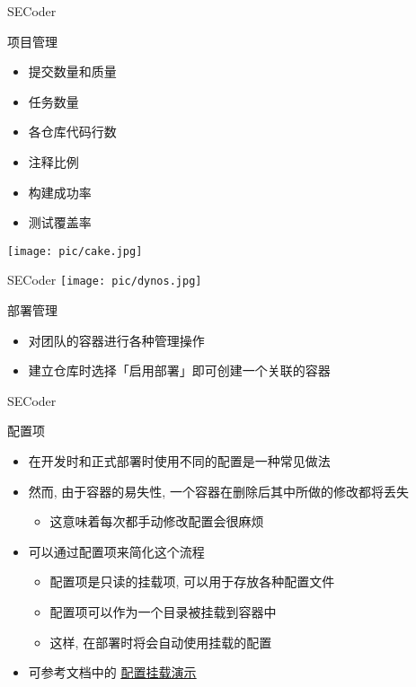 \documentclass{beamer}
\begin{document}
\begin{frame}{SECoder}
    \begin{minipage}{0.35\linewidth}
        \begin{block}{项目管理}
            \begin{itemize}
                \item 提交数量和质量
                \item 任务数量
                \item 各仓库代码行数
                \item 注释比例
                \item 构建成功率
                \item 测试覆盖率
            \end{itemize}
        \end{block}
    \end{minipage}
    \begin{minipage}{0.6\linewidth}
        \centering\texttt{[image: pic/cake.jpg]}
    \end{minipage}
\end{frame}

\begin{frame}{SECoder}
    \centering\texttt{[image: pic/dynos.jpg]}
    \begin{block}{部署管理}
        \begin{itemize}
        \item 对团队的容器进行各种管理操作
        \item 建立仓库时选择「启用部署」即可创建一个关联的容器
        \end{itemize}
    \end{block}
\end{frame}

\begin{frame}{SECoder}
    \begin{block}{配置项}
        \begin{itemize}
            \item 在开发时和正式部署时使用不同的配置是一种常见做法
            \item 然而, 由于容器的易失性, 一个容器在删除后其中所做的修改都将丢失
            \begin{itemize}\item 这意味着每次都手动修改配置会很麻烦
            \end{itemize}
            \item 可以通过配置项来简化这个流程
            \begin{itemize}\item 配置项是只读的挂载项, 可以用于存放各种配置文件
            \item 配置项可以作为一个目录被挂载到容器中
            \item 这样, 在部署时将会自动使用挂载的配置
            \end{itemize}
            \item 可参考文档中的 \href{https://thuse-course.github.io/course-index/deploy/secoder/\#\_12}{\underline{配置挂载演示}}
        \end{itemize}
    \end{block}
\end{frame}
\end{document}

